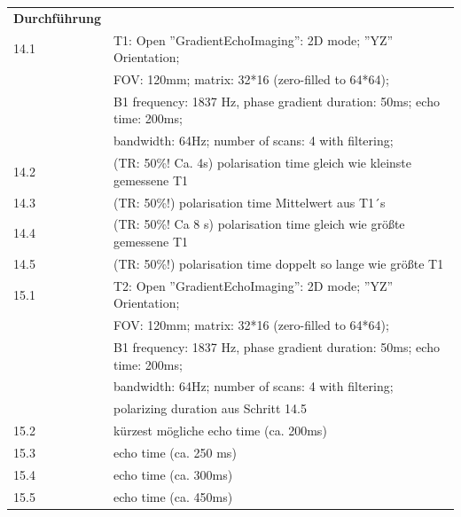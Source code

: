 \begin{tabular}{ll}
    \textbf{Durchführung} & \\

    14.1 & T1:  Open ''GradientEchoImaging'': 2D mode; ''YZ'' Orientation; \\

         &  FOV: 120mm; matrix: 32*16 (zero-filled to 64*64);  \\

         & B1 frequency: 1837 Hz, phase gradient duration: 50ms; echo time: 200ms;  \\

         &  bandwidth: 64Hz; number of scans: 4 with filtering; \\

    14.2 & (TR: 50\%! Ca. 4s) polarisation time gleich wie kleinste gemessene T1\\

    14.3 & (TR: 50\%!) polarisation time Mittelwert aus T1´s \\

    14.4 & (TR: 50\%! Ca 8 s) polarisation time gleich wie größte gemessene T1\\

    14.5 & (TR: 50\%!) polarisation time doppelt so lange wie größte T1\\

    15.1 & T2:  Open ''GradientEchoImaging'': 2D mode; ''YZ'' Orientation; \\

         &  FOV: 120mm; matrix: 32*16 (zero-filled to 64*64);  \\

         & B1 frequency: 1837 Hz, phase gradient duration: 50ms; echo time: 200ms;  \\

         &  bandwidth: 64Hz; number of scans: 4 with filtering; \\

         & polarizing duration aus Schritt 14.5 \\

    15.2 & kürzest mögliche echo time (ca. 200ms) \\

    15.3 & echo time (ca. 250 ms) \\

    15.4 & echo time (ca. 300ms) \\

    15.5 & echo time (ca. 450ms) \\

\end{tabular}  

